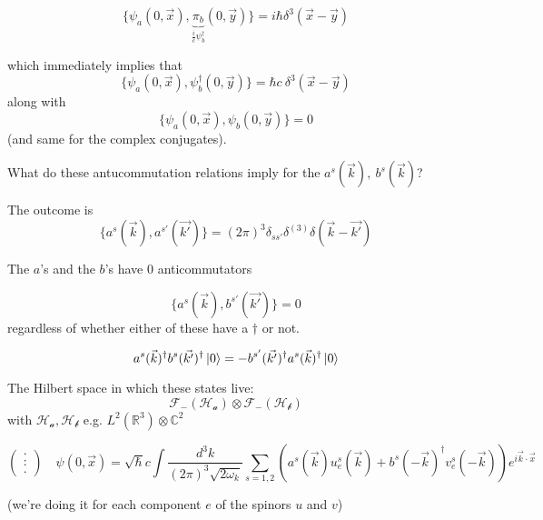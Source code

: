 \documentclass[11pt]{article}
\begin{document}
	\[ \{ \psi_a(0, \vec{x}), \underbrace{\pi_b}_{\frac{i}{c}\psi^\dagger_b}(0, \vec{y}) \} = i\hbar \delta^3(\vec{x} - \vec{y})\]
	
	which immediately implies that
	\[ \{ \psi_a(0, \vec{x}), \psi_b^\dagger(0, \vec{y})\} = \hbar c\ \delta^3 (\vec{x}-\vec{y})\]
	along with\[\{\psi_a(0, \vec{x}), \psi_b(0, \vec{y})\} = 0\]
	(and same for the complex conjugates).
	
	What do these antucommutation relations imply for the $a^s(\vec{k}),\ b^s(\vec{k})$? 
	
	The outcome is
	\[  \{a^s (\vec{k}), a^{s'}(\vec{k'}) \} = (2\pi)^3\delta_{ss'}\delta^{(3)}\delta(\vec{k}-\vec{k'})\]
	
	The $a$'s and the $b$'s have 0 anticommutators
	
	\[ \{a^s(\vec{k}), b^{s'}(\vec{k'})\} = 0\]
	regardless of whether either of these have a $\dagger$ or not.
	
	\[ a^s(\vec{k})^\dagger b^s(\vec{k'})^\dagger \ket{0} = -b^{s'} (\vec{k'})^\dagger a^s(\vec{k})^\dagger\ket{0}\]
	
	The Hilbert space in which these states live: \[\mathcal{F}_-(\mathcal{H_a}) \otimes \mathcal{F}_-(\mathcal{H_b}) \]
	with $\mathcal{H_a}, \mathcal{H_b}$  e.g. $L^2(\mathbb{R}^3) \otimes \mathbb{C}^2$
	
	\[\begin{pmatrix}
		.\\:\\.
	\end{pmatrix}\quad \psi(0, \vec{x}) = \sqrt{\hbar}c \int \frac{d^3k}{(2\pi)^3 \sqrt{2\omega_k}} \sum_{s=1,2} (a^s(\vec{k})u^s_e(\vec{k}) + b^s(-\vec{k})^\dagger v^s_e(-\vec{k}))e^{i\vec{k}\cdot\vec{x}}\]
	
	(we're doing it for each component $e$ of the spinors $u$ and $v$)
	
\end{document}
